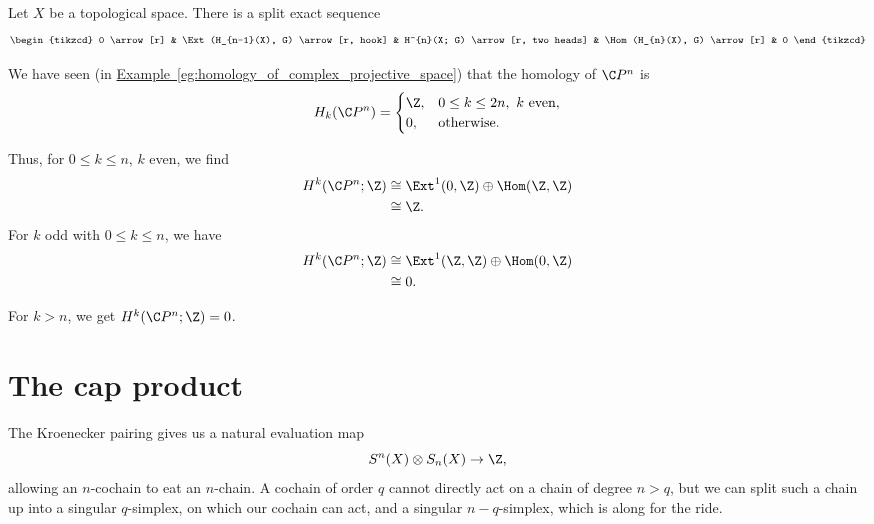 \documentclass[main.tex]{subfiles}
\begin{document}
\begin{theorem}
  Let $X$ be a topological space. There is a split exact sequence
  \begin{equation*}
    \begin{tikzcd}
      0
      \arrow[r]
      & \Ext(H_{n-1}(X), G)
      \arrow[r, hook]
      & H^{n}(X; G)
      \arrow[r, two heads]
      & \Hom(H_{n}(X), G)
      \arrow[r]
      & 0
    \end{tikzcd}
  \end{equation*}
\end{theorem}

\begin{example}
  We have seen (in \hyperref[eg:homology_of_complex_projective_space]{Example~\ref*{eg:homology_of_complex_projective_space}}) that the homology of $\C P^{n}$ is
  \begin{equation*}
    H_{k}(\C P^{n}) =
    \begin{cases}
      \Z, &0 \leq k \leq 2n,\ k \text{ even},\\
      0, &\text{otherwise}.
    \end{cases}
  \end{equation*}

  Thus, for $0 \leq k \leq n$, $k$ even, we find
  \begin{align*}
    H^{k}(\C P^{n}; \Z) &\cong \Ext^{1}(0, \Z) \oplus \Hom(\Z,\Z) \\
    &\cong \Z.
  \end{align*}
  For $k$ odd with $0 \leq k \leq n$, we have
  \begin{align*}
    H^{k}(\C P^{n}; \Z) &\cong \Ext^{1}(\Z, \Z) \oplus \Hom(0,\Z) \\
    &\cong 0.
  \end{align*}

  For $k > n$, we get $H^{k}(\C P^{n}; \Z) = 0$.
\end{example}

\section{The cap product}
\label{sec:the_cap_product}

The Kroenecker pairing gives us a natural evaluation map
\begin{equation*}
  S^{n}(X) \otimes S_{n}(X) \to \Z,
\end{equation*}
allowing an $n$-cochain to eat an $n$-chain. A cochain of order $q$ cannot directly act on a chain of degree $n > q$, but we can split such a chain up into a singular $q$-simplex, on which our cochain can act, and a singular $n-q$-simplex, which is along for the ride.
\end{document}
